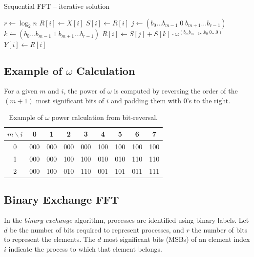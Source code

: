 \documentclass[12pt]{book}
\begin{document}
\begin{algorithm}[H]
\caption{Sequential FFT – iterative solution}
\label{alg:itrseqfft}
\begin{algorithmic}[1]
    \State $r \gets \log_2 n$
        \State $R[i] \gets X[i]$
    \EndFor
            \State $S[i] \gets R[i]$
        \EndFor
            \State $j \gets (b_0 \ldots b_{m-1} \; 0 \; b_{m+1} \ldots b_{r-1})$
            \State $k \gets (b_0 \ldots b_{m-1} \; 1 \; b_{m+1} \ldots b_{r-1})$
            \State $R[i] \gets S[j] + S[k] \cdot \omega^{(b_m b_{m-1}\ldots b_0 \; 0 \ldots 0)}$
        \EndFor
    \EndFor
        \State $Y[i] \gets R[i]$
    \EndFor
\EndProcedure
\end{algorithmic}
\end{algorithm}


\subsection*{Example of $\omega$ Calculation}
For a given $m$ and $i$, the power of $\omega$ is computed by reversing the order of the $(m+1)$ most significant bits of $i$ and padding them with $0$’s to the right.

\begin{table}[H]
    \centering
    \begin{tabular}{c|cccccccc}
        $m \backslash i$ & 0 & 1 & 2 & 3 & 4 & 5 & 6 & 7 \\
        \hline
        0 & 000 & 000 & 000 & 000 & 100 & 100 & 100 & 100 \\
        1 & 000 & 000 & 100 & 100 & 010 & 010 & 110 & 110 \\
        2 & 000 & 100 & 010 & 110 & 001 & 101 & 011 & 111 \\
    \end{tabular}
    \caption{Example of $\omega$ power calculation from bit-reversal.}
    \label{tab:fft-omega}
\end{table}

\subsection*{Binary Exchange FFT}
In the \textit{binary exchange} algorithm, processes are identified using binary labels.  
Let $d$ be the number of bits required to represent processes, and $r$ the number of bits to represent the elements. The $d$ most significant bits (MSBs) of an element index $i$ indicate the process to which that element belongs.  
\end{document}
